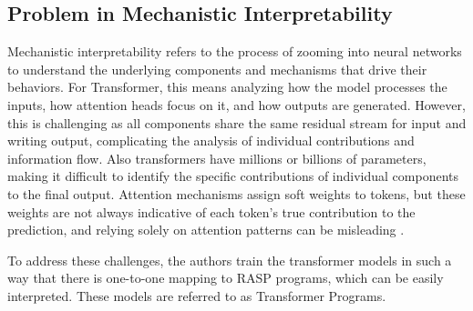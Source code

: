 \subsection{Problem in Mechanistic Interpretability}

Mechanistic interpretability refers to the process of zooming into neural networks to understand the underlying components and mechanisms that drive their behaviors\cite{olah2020zoom}. For Transformer, this means analyzing how the model processes the inputs, how attention heads focus on it, and how outputs are generated. However, this is challenging as all components share the same residual stream for input and writing output, complicating the analysis of individual contributions and information flow. Also transformers have millions or billions of parameters, making it difficult to identify the specific contributions of individual components to the final output.  Attention mechanisms assign soft weights to tokens, but these weights are not always indicative of each token's true contribution to the prediction, and relying solely on attention patterns can be misleading \cite{jain2019attention,bolukbasi2021interpretability}.

To address these challenges, the authors train the transformer models in such a way that there is one-to-one mapping to RASP programs, which can be easily interpreted. These models are referred to as Transformer Programs.